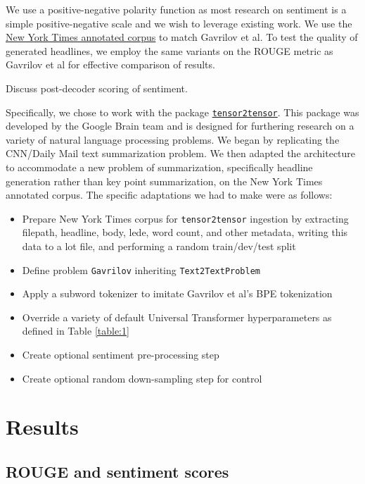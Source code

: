 \documentclass[11pt]{article}
\begin{document}
We use a positive-negative polarity function as most research on sentiment is a simple positive-negative scale and we wish to leverage existing work. We use the \href{https://catalog.ldc.upenn.edu/LDC2008T19}{New York Times annotated corpus} to match Gavrilov et al. 
To test the quality of generated headlines, we employ the same variants on the ROUGE metric as Gavrilov et al for effective comparison of results.

Discuss post-decoder scoring of sentiment.

Specifically, we chose to work with the package \href{https://github.com/tensorflow/tensor2tensor}{\texttt{tensor2tensor}}. This package was developed by the Google Brain team and is designed for furthering research on a variety of natural language processing problems. We began by replicating the CNN/Daily Mail text summarization problem. We then adapted the architecture to accommodate a new problem of summarization, specifically headline generation rather than key point summarization, on the New York Times annotated corpus. The specific adaptations we had to make were as follows:

\begin{itemize}
    \item Prepare New York Times corpus for \texttt{tensor2tensor} ingestion by extracting filepath, headline, body, lede, word count, and other metadata, writing this data to a lot file, and performing a random train/dev/test split
    \item Define problem \texttt{Gavrilov} inheriting \texttt{Text2TextProblem}
    \item Apply a subword tokenizer to imitate Gavrilov et al's BPE tokenization
    \item Override a variety of default Universal Transformer hyperparameters as defined in Table \ref{table:1}
    \item Create optional sentiment pre-processing step
    \item Create optional random down-sampling step for control
\end{itemize}

\section{Results}
\subsection{ROUGE and sentiment scores}
\end{document}
